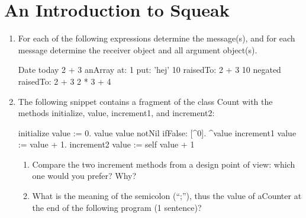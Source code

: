 \documentclass{article}
\begin{document}
\section{An Introduction to Squeak}
\begin{enumerate}
\item For each of the following expressions determine
the message(s), and for each message determine the receiver object and all 
argument object(s). 
\begin{java}
Date today 
2 + 3 
anArray at: 1 put: 'hej'
10 raisedTo: 2 + 3
10 negated raisedTo: 2 + 3
2 * 3 + 4      
\end{java}
\item The following snippet contains a fragment of the class \textsf{Count} with the methods \textsf{initialize},
 \textsf{value},  \textsf{increment1}, and \textsf{increment2}:
\begin{java}
initialize
    value := 0.
value
    value notNil ifFalse: [^0].
    ^value
increment1
    value := value + 1.
increment2
    value := self value + 1
\end{java}
\begin{enumerate}
\item Compare the two increment
methods from a design point of view: which one would you prefer?  Why?
\item What is the meaning of the semicolon (``;''), thus  the value of \textsf{aCounter} at the end of  the following program (1 sentence)?


\end{enumerate}
\end{enumerate}
\end{document}
